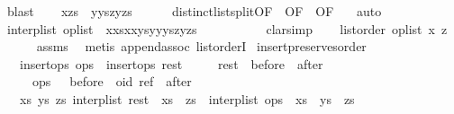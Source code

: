 \begin{isabellebody}
\ blast\isanewline
\ \ \isamarkupfalse%
\ {\isachardoublequoteopen}xzs\ {\isacharequal}\ yys{\isacharat}{\isacharbrackleft}z{\isacharbrackright}{\isacharat}yzs{\isachardoublequoteclose}\isanewline
\ \ \ \ \isamarkupfalse%
\ distinct{\isacharunderscore}list{\isacharunderscore}split{\isacharbrackleft}OF\ {}{\isacharcomma}\ OF\ {}{\isacharcomma}\ OF\ {}{\isacharbrackright}\ \isamarkupfalse%
\ auto\isanewline
\ \ \isamarkupfalse%
\ {\isachardoublequoteopen}interp{\isacharunderscore}list\ op{\isacharunderscore}list\ {\isacharequal}\ xxs{\isacharat}{\isacharbrackleft}x{\isacharbrackright}{\isacharat}xys{\isacharat}{\isacharbrackleft}y{\isacharbrackright}{\isacharat}yys{\isacharat}{\isacharbrackleft}z{\isacharbrackright}{\isacharat}yzs{\isachardoublequoteclose}\isanewline
\ \ \ \ \isamarkupfalse%
\ {}\ {}\ {}\ \isamarkupfalse%
\ clarsimp\isanewline
\ \ \isamarkupfalse%
\ {\isachardoublequoteopen}list{\isacharunderscore}order\ op{\isacharunderscore}list\ x\ z{\isachardoublequoteclose}\isanewline
\ \ \ \ \isamarkupfalse%
\ assms\ \isamarkupfalse%
\ {\isacharparenleft}metis\ append{\isachardot}assoc\ list{\isacharunderscore}orderI{\isacharparenright}\isanewline
{}\isamarkupfalse%
%
\endisatagproof
{\isafoldproof}%
%
\isadelimproof
\isanewline
%
\endisadelimproof
\isanewline
{}\isamarkupfalse%
\ insert{\isacharunderscore}preserves{\isacharunderscore}order{\isacharcolon}\isanewline
\ \ \ {\isachardoublequoteopen}insert{\isacharunderscore}ops\ ops{\isachardoublequoteclose}\ \ {\isachardoublequoteopen}insert{\isacharunderscore}ops\ rest{\isachardoublequoteclose}\isanewline
\ \ \ \ \ {\isachardoublequoteopen}rest\ {\isacharequal}\ before\ {\isacharat}\ after{\isachardoublequoteclose}\isanewline
\ \ \ \ \ {\isachardoublequoteopen}ops\ \ {\isacharequal}\ before\ {\isacharat}\ {\isacharparenleft}oid{\isacharcomma}\ ref{\isacharparenright}\ {\isacharhash}\ after{\isachardoublequoteclose}\isanewline
\ \ \ {\isachardoublequoteopen}{\isasymexists}xs\ ys\ zs{\isachardot}\ interp{\isacharunderscore}list\ rest\ {\isacharequal}\ xs\ {\isacharat}\ zs\ {\isasymand}\ interp{\isacharunderscore}list\ ops\ {\isacharequal}\ xs\ {\isacharat}\ ys\ {\isacharat}\ zs{\isachardoublequoteclose}\isanewline
%
\isadelimproof
%
\endisadelimproof
%
\isatagproof
{}\isamarkupfalse%

\end{isabellebody}
